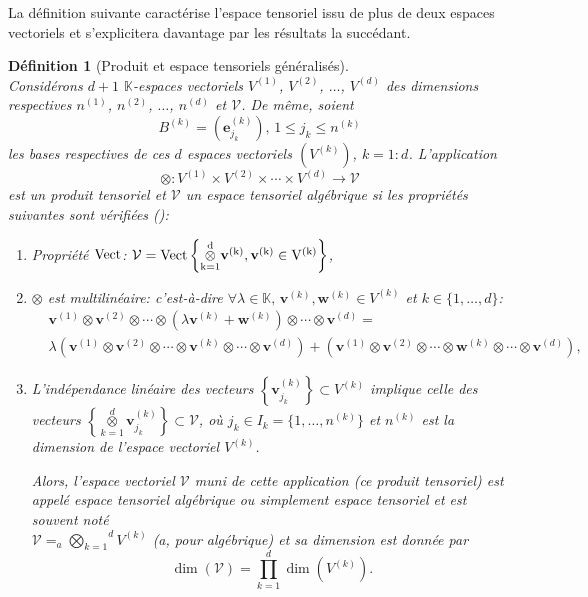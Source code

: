 \documentclass[11pt,a4paper,oneside]{book}
\newtheorem{defi}{Définition}[chapter]
\def\K{\mathbb K}
\def\V{\mathcal V}
\def\ktensor{\overset{d}{\underset{k=1}{\otimes}}}
\def\v{\mathbf v}
\def\w{\mathbf w}
\def\gktensor{\overset{d}{\underset{k=1}{\bigotimes}}}
\def\spam{\rm Vect}
\newcommand{\mbf}[1]{\mathbf{#1}}
\begin{document}
La définition suivante caractérise l'espace tensoriel issu de plus de deux espaces vectoriels et s'explicitera davantage par les résultats la succédant.
\begin{defi}[Produit et espace tensoriels généralisés]\label{poposition3.21}
	\emph{\\}
Considérons $ d+1 $ $ \K $-espaces vectoriels $ V^{(1)} $, $ V^{(2)} $, $ \dots $, $ V^{(d)} $ des dimensions respectives  $ n^{(1)} $, $ n^{(2)} $, $ \dots $, $ n^{(d)} $ et $ \V $. De même, soient
	$$B^{(k)}=\left(\mbf{e}_{j_{k}}^{(k)}\right),\, 1\leq j_{k}\leq n^{(k)} $$ les bases respectives de ces $ d $ espaces vectoriels $ \left(V^{(k)}\right) $, $ k=1:d $. L'application $$ \otimes : V^{(1)}\times V^{(2)}\times \cdots\times V^{(d)}\longrightarrow \V $$ est un produit tensoriel et $ \V $ un espace tensoriel algébrique si les propriétés suivantes sont vérifiées (\cite[p.125]{Nyenyezi2018}):
	\begin{enumerate}
		\item[$ (1) $]
		Propriété $ \spam $: $\V=\spam\left\{\ktensor \v^{(k)},\v^{(k)}\in V^{(k)}\right\}$,
		\item[$ (2) $]
		$ \otimes $ est multilinéaire: c'est-à-dire $ \forall \lambda\in \K,\, \v^{(k)},\w^{(k)}\in V^{(k)} $ et $ k\in \{1,\dots,d\} $:
		\begin{eqnarray}
		&\v^{(1)}\otimes \v^{(2)}\otimes\cdots\otimes\left(\lambda \v^{(k)}+\w^{(k)}\right)\otimes \cdots\otimes \v^{(d)}=&\nonumber\\
		&\lambda (\v^{(1)}\otimes \v^{(2)}\otimes\cdots\otimes \v^{(k)}\otimes \cdots
		\otimes \v^{(d)})+\left(\v^{(1)}\otimes \v^{(2)}\otimes\cdots\otimes \w^{(k)}\otimes \cdots\otimes \v^{(d)}\right),&\nonumber
		\end{eqnarray}
		\item[$ (3) $]
		L'indépendance linéaire des vecteurs $ \left\{\v_{j_{k}}^{(k)}\right\}\subset V^{(k)}$  implique celle des vecteurs $ \left\{\ktensor \v_{j_{k}}^{(k)}\right\}\subset \V $, où $ j_{k}\in I_{k}=\{1,\dots,n^{(k)}\} $ et $ n^{(k)} $ est la dimension de l'espace vectoriel $ V^{(k)} $.
		
		Alors, l'espace vectoriel $ \V $ muni de cette application (ce produit tensoriel) est appelé espace tensoriel algébrique ou simplement espace tensoriel et  est souvent noté \\$ \V=_{a}\gktensor V^{(k)} $ (a, pour algébrique) et sa dimension est donnée par
		\begin{equation}\label{3.17}
		\dim(\V)=\prod_{k=1}^{d}\dim \left(V^{(k)}\right).
		\end{equation}
	\end{enumerate}
	
\end{defi}
\end{document}
